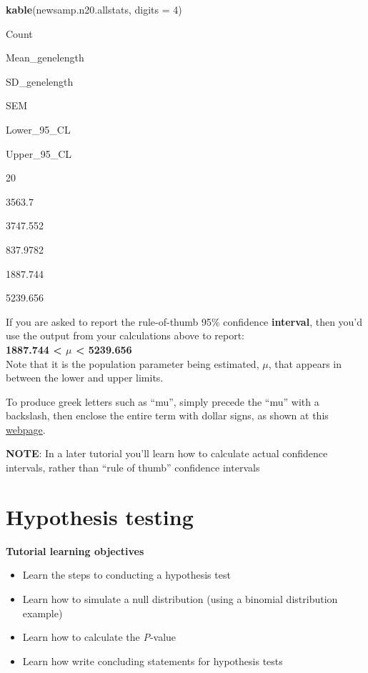 \documentclass[
]{book}
\newenvironment{Shaded}{\begin{snugshade}}{\end{snugshade}}
\newcommand{\AttributeTok}[1]{\textcolor[rgb]{0.13,0.29,0.53}{#1}}
\newcommand{\DecValTok}[1]{\textcolor[rgb]{0.00,0.00,0.81}{#1}}
\newcommand{\FunctionTok}[1]{\textcolor[rgb]{0.13,0.29,0.53}{\textbf{#1}}}
\newcommand{\NormalTok}[1]{#1}
\providecommand{\tightlist}{%
  \setlength{\itemsep}{0pt}\setlength{\parskip}{0pt}}
\begin{document}
\begin{Shaded}
\begin{Highlighting}[]
\FunctionTok{kable}\NormalTok{(newsamp.n20.allstats, }\AttributeTok{digits =} \DecValTok{4}\NormalTok{)}
\end{Highlighting}
\end{Shaded}

Count

Mean\_genelength

SD\_genelength

SEM

Lower\_95\_CL

Upper\_95\_CL

20

3563.7

3747.552

837.9782

1887.744

5239.656

If you are asked to report the rule-of-thumb 95\% confidence \textbf{interval}, then you'd use the output from your calculations above to report:\\
\textbf{1887.744 \textless{} \(\mu\) \textless{} 5239.656}\\
Note that it is the population parameter being estimated, \(\mu\), that appears in between the lower and upper limits.

To produce greek letters such as ``mu'', simply precede the ``mu'' with a backslash, then enclose the entire term with dollar signs, as shown at this \href{http://www.evanlray.com/stat242_f2019/resources/R/MathinRmd.html}{webpage}.

\textbf{NOTE}: In a later tutorial you'll learn how to calculate actual confidence intervals, rather than ``rule of thumb'' confidence intervals

\chapter{Hypothesis testing}\label{hypothesis}

\textbf{Tutorial learning objectives}

\begin{itemize}
\tightlist
\item
  Learn the steps to conducting a hypothesis test
\item
  Learn how to simulate a null distribution (using a binomial distribution example)
\item
  Learn how to calculate the \emph{P}-value
\item
  Learn how write concluding statements for hypothesis tests
\end{itemize}
\end{document}

